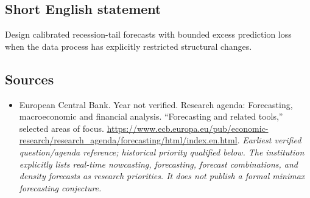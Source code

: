 \documentclass[11pt]{article}
\begin{document}
\subsection{Short English statement}
Design calibrated recession-tail forecasts with bounded excess prediction loss when the data process has explicitly restricted structural changes.

\subsection{Sources}
\begin{itemize}\raggedright
\item[\textnormal{[S1]}]\hypertarget{source:30007520:1}{} European Central Bank. Year not verified. Research agenda: Forecasting, macroeconomic and financial analysis. “Forecasting and related tools,” selected areas of focus.
\url{https://www.ecb.europa.eu/pub/economic-research/research_agenda/forecasting/html/index.en.html}.
{\small\textit{Earliest verified question/agenda reference; historical priority qualified below. The institution explicitly lists real-time nowcasting, forecasting, forecast combinations, and density forecasts as research priorities. It does not publish a formal minimax forecasting conjecture.}}
\end{itemize}
\end{document}
